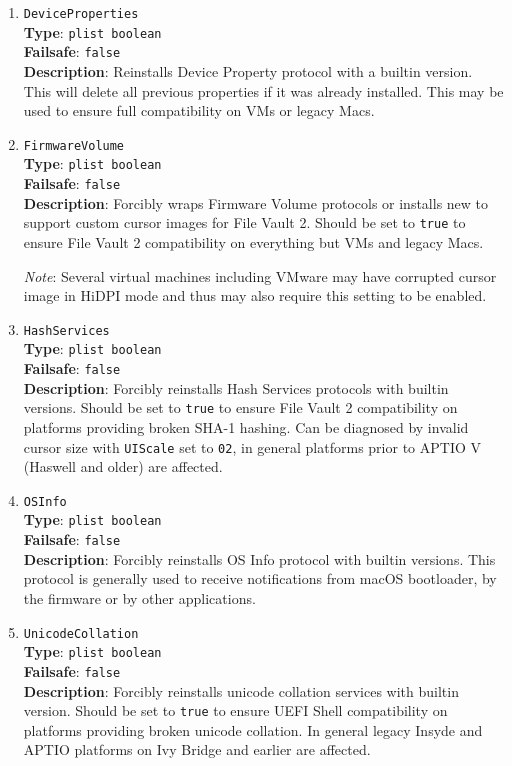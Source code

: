\documentclass[]{article}
\begin{document}
\begin{enumerate}
\item
  \texttt{DeviceProperties}\\
  \textbf{Type}: \texttt{plist\ boolean}\\
  \textbf{Failsafe}: \texttt{false}\\
  \textbf{Description}: Reinstalls Device Property protocol with a builtin
  version. This will delete all previous properties if it was already installed.
  This may be used to ensure full compatibility on VMs or legacy Macs.

\item
  \texttt{FirmwareVolume}\\
  \textbf{Type}: \texttt{plist\ boolean}\\
  \textbf{Failsafe}: \texttt{false}\\
  \textbf{Description}: Forcibly wraps Firmware Volume protocols or installs new
  to support custom cursor images for File Vault 2. Should be set to \texttt{true}
  to ensure File Vault 2 compatibility on everything but VMs and legacy Macs.

  \emph{Note}: Several virtual machines including VMware may have corrupted
  cursor image in HiDPI mode and thus may also require this setting to be enabled.

\item
  \texttt{HashServices}\\
  \textbf{Type}: \texttt{plist\ boolean}\\
  \textbf{Failsafe}: \texttt{false}\\
  \textbf{Description}: Forcibly reinstalls Hash Services protocols with builtin
  versions. Should be set to \texttt{true} to ensure File Vault 2 compatibility
  on platforms providing broken SHA-1 hashing. Can be diagnosed by invalid
  cursor size with \texttt{UIScale} set to \texttt{02}, in general platforms
  prior to APTIO V (Haswell and older) are affected.

\item
  \texttt{OSInfo}\\
  \textbf{Type}: \texttt{plist\ boolean}\\
  \textbf{Failsafe}: \texttt{false}\\
  \textbf{Description}: Forcibly reinstalls OS Info protocol with builtin
  versions. This protocol is generally used to receive notifications from macOS
  bootloader, by the firmware or by other applications.

\item
  \texttt{UnicodeCollation}\\
  \textbf{Type}: \texttt{plist\ boolean}\\
  \textbf{Failsafe}: \texttt{false}\\
  \textbf{Description}: Forcibly reinstalls unicode collation services with builtin
  version. Should be set to \texttt{true} to ensure UEFI Shell compatibility
  on platforms providing broken unicode collation. In general legacy Insyde and APTIO
  platforms on Ivy Bridge and earlier are affected.

\end{enumerate}
\end{document}
